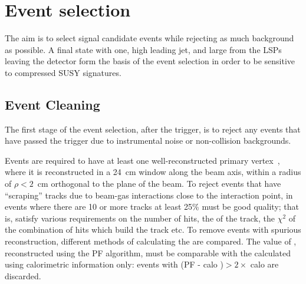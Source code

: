 \section{Event selection}
\label{sec:ANA}

The aim is to select signal candidate events while rejecting as much background as possible.
A final state with one, high \pt leading jet, and large \MET from the LSPs leaving the detector form the basis of the event selection in order to be sensitive to compressed \ac{SUSY} signatures.

\subsection{Event Cleaning}

The first stage of the event selection, after the trigger, is to reject any events that have passed the trigger due to instrumental noise or non-collision backgrounds.

Events are required to have at least one well-reconstructed primary vertex~\cite{bib:ANA_Tk}, where it is reconstructed in a 24~cm window along the beam axis, within a radius of $\rho<2$~cm orthogonal to the plane of the beam. %
To reject events that have ``scraping'' tracks due to beam-gas interactions close to the interaction point, in events where there are 10 or more tracks at least 25\% must be good quality; that is, satisfy various requirements on the number of hits, the \pt of the track, the $\chi^{2}$ of the combination of hits which build the track etc.
To remove events with spurious \MET reconstruction, different methods of calculating the \MET are compared. The value of \MET, reconstructed using the \ac{PF} algorithm, must be comparable with the \MET calculated using calorimetric information only: events with (PF \MET - calo \MET)$ > 2 \times$ calo \MET are discarded.





